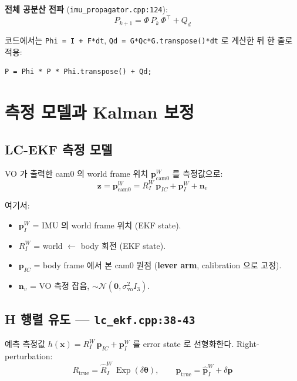 \documentclass[11pt,a4paper,oneside]{report}
\newcommand{\T}{^{\!\top}}
\DeclareMathOperator{\Exp}{Exp}
\begin{document}
\textbf{전체 공분산 전파} (\texttt{imu\_propagator.cpp:124}):
\begin{equation}
\boxed{P_{k+1} = \Phi \, P_k \, \Phi\T + Q_d}
\end{equation}

코드에서는 \texttt{Phi = I + F*dt}, \texttt{Qd = G*Qc*G.transpose()*dt} 로 계산한 뒤 한 줄로 적용:
\begin{lstlisting}[style=cpp, caption={imu\_propagator.cpp:124}]
P = Phi * P * Phi.transpose() + Qd;
\end{lstlisting}

\section{측정 모델과 Kalman 보정}

\subsection{LC-EKF 측정 모델}

VO 가 출력한 cam0 의 world frame 위치 \(\bm{p}_{\text{cam0}}^W\) 를 측정값으로:
\begin{equation}
\bm{z} = \bm{p}_{\text{cam0}}^W = R^W_I \, \bm{p}_{IC} + \bm{p}^W_I + \bm{n}_v
\end{equation}

여기서:
\begin{itemize}
\item \(\bm{p}^W_I\) = IMU 의 world frame 위치 (EKF state).
\item \(R^W_I\) = world \(\leftarrow\) body 회전 (EKF state).
\item \(\bm{p}_{IC}\) = body frame 에서 본 cam0 원점 (\textbf{lever arm}, calibration 으로 고정).
\item \(\bm{n}_v\) = VO 측정 잡음, \(\sim \mathcal{N}(\bm{0}, \sigma_{\text{vo}}^2 I_3)\).
\end{itemize}

\subsection{H 행렬 유도 — \texttt{lc\_ekf.cpp:38-43}}

예측 측정값 \(h(\bm{x}) = R^W_I\,\bm{p}_{IC} + \bm{p}^W_I\) 를 error state 로 선형화한다. Right-perturbation:
\begin{equation}
R_{\text{true}} = \hat{R}^W_I\,\Exp(\delta\bm{\theta}), \qquad
\bm{p}_{\text{true}} = \hat{\bm{p}}^W_I + \delta\bm{p}
\end{equation}
\end{document}
